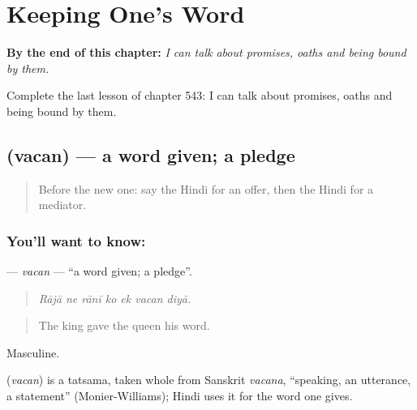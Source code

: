 
\chapter{Keeping One's Word}
\label{ch:hi-keeping-one-s-word}

\begin{chapteropening}
\textbf{By the end of this chapter:} \emph{I can talk about promises, oaths and being bound by them.}

Complete the last lesson of chapter 543: I can talk about promises, oaths and being bound by them.
\end{chapteropening}

\section[\texorpdfstring{\hi{वचन} (vacan)}{वचन (vacan)}]{ (vacan) — a word given; a pledge}

\label{lesson:HI-C543-vacan}



\begin{quote}
Before the new one: say the Hindi for an offer, then the Hindi for a mediator.
\end{quote}

\subsection*{You'll want to know: }
\textbf{} — \emph{vacan} — \textquotedblleft{}a word given; a pledge\textquotedblright{}.

\begin{quote}
      
\end{quote}

\begin{quote}
\emph{Rājā ne rānī ko ek vacan diyā.}
\end{quote}

\begin{quote}
The king gave the queen his word.
\end{quote}

Masculine.

\begin{cousinweb}
\textbf{} (\emph{vacan}) is a tatsama, taken whole from Sanskrit \emph{vacana}, \textquotedblleft{}speaking, an utterance, a statement\textquotedblright{} (Monier-Williams); Hindi uses it for the word one gives.
\end{cousinweb}

